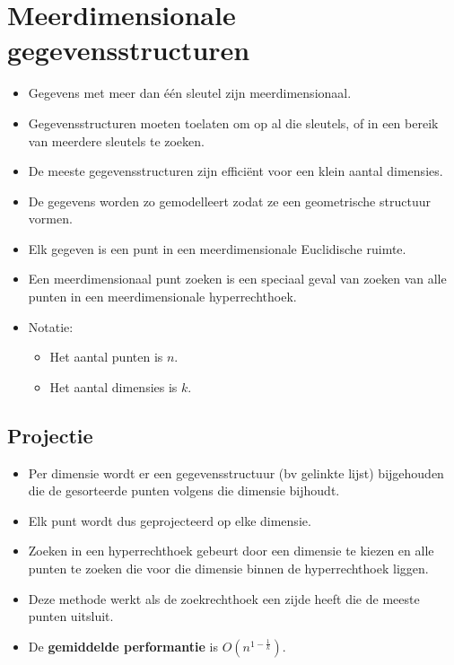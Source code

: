 \chapter{Meerdimensionale gegevensstructuren}
\begin{itemize}
    \item Gegevens met meer dan één sleutel zijn meerdimensionaal.
    \item Gegevensstructuren moeten toelaten om op al die sleutels, of in een bereik van meerdere sleutels te zoeken.
    \item De meeste gegevensstructuren zijn efficiënt voor een klein aantal dimensies.
    \item De gegevens worden zo gemodelleert zodat ze een geometrische structuur vormen.
    \item Elk gegeven is een punt in een meerdimensionale Euclidische ruimte.
    \item Een meerdimensionaal punt zoeken is een speciaal geval van zoeken van alle punten in een meerdimensionale hyperrechthoek.
    \item Notatie:
    \begin{itemize}
        \item Het aantal punten is $n$.
        \item Het aantal dimensies is $k$.
    \end{itemize}
\end{itemize}

\section{Projectie}
\begin{itemize}
    \item Per dimensie wordt er een gegevensstructuur (bv gelinkte lijst) bijgehouden die de gesorteerde punten volgens die dimensie bijhoudt.
    \item Elk punt wordt dus geprojecteerd op elke dimensie.
    \item Zoeken in een hyperrechthoek gebeurt door een dimensie te kiezen en alle punten te zoeken die voor die dimensie binnen de hyperrechthoek liggen.
    \item Deze methode werkt als de zoekrechthoek een zijde heeft die de meeste punten uitsluit.
    \item De \textbf{gemiddelde performantie} is $O(n^{1-\frac{1}{k}})$.
\end{itemize}
